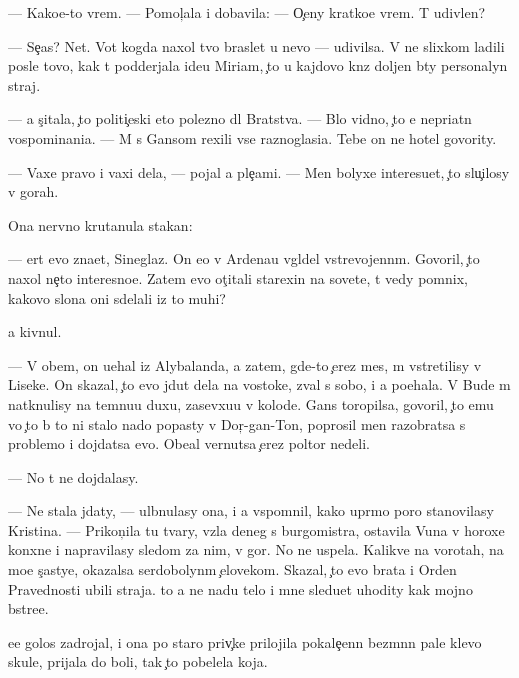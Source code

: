 \documentclass[10pt]{book}
\begin{document}
— Kako{\y}e-to vrem{\ia}. — Pomol{\c}ala i dobavila: — O{\c}eny kratko{\y}e vrem{\ia}. T{\yi} udivlen?

— Se{\y}{\c}as? Net. Vot kogda naxol tvo{\y} braslet u nevo — udivilsa. V{\yi} ne slixkom ladili posle tovo, kak t{\yi} podderjala ide{\y}u Miriam, {\c}to u kajdovo kn{\ia}z{\ia} doljen b{\yi}ty personalyn{\yi}{\y} straj.

— {\Y}a s{\c}itala, {\c}to politi{\c}eski eto polezno dl{\ia} Bratstva. — B{\yi}lo vidno, {\c}to {\y}e{\y} nepri{\y}atn{\yi} vospominani{\y}a. — M{\yi} s Gansom rexili vse raznoglasi{\y}a. Tebe on ne hotel govority.

— Vaxe pravo i vaxi dela, — pojal {\y}a ple{\c}ami. — Men{\ia} bolyxe interesu{\y}et, {\c}to slu{\c}ilosy v gorah.

Ona nervno krutanula stakan:

— {\C}ert {\y}evo zna{\y}et, Sineglaz{\yi}{\y}. On {\y}e{\x}o v Ardenau v{\yi}gl{\ia}del vstrevojenn{\yi}m. Govoril, {\c}to naxol ne{\c}to interesno{\y}e. Zatem {\y}evo ot{\c}itali stare{\y}xin{\yi} na sovete, t{\yi} vedy pomnix, kakovo slona oni sdelali iz to{\y} muhi?

{\Y}a kivnul.

— V ob{\x}em, on u{\y}ehal iz Alybalanda, a zatem, gde-to {\c}erez mes{\ia}{\q}, m{\yi} vstretilisy v Lise{\q}ke. On skazal, {\c}to {\y}evo jdut dela na vostoke, zval s sobo{\y}, i {\y}a po{\y}ehala. V Bude m{\yi} natknulisy na temnu{\y}u duxu, zasevxu{\y}u v kolod{\q}e. Gans toropilsa, govoril, {\c}to {\y}emu vo {\c}to b{\yi} to ni stalo nado popasty v Dor{\c}-gan-To{\y}n, poprosil men{\ia} razobratsa s problemo{\y} i dojdatsa {\y}evo. Obe{\x}al vernutsa {\c}erez poltor{\yi} nedeli.

— No t{\yi} ne dojdalasy.

— Ne stala jdaty, — ul{\yi}bnulasy ona, i {\y}a vspomnil, kako{\y} upr{\ia}mo{\y} poro{\y} stanovilasy Kristina. — Prikon{\c}ila tu tvary, vz{\ia}la deneg s burgomistra, ostavila V{\y}una v horoxe{\y} kon{\iu}xne i napravilasy sledom za nim, v gor{\yi}. No ne uspela. Kalikve{\q} na vorotah, na mo{\y}e s{\c}astye, okazalsa serdobolyn{\yi}m {\c}elovekom. Skazal, {\c}to {\y}evo brat{\y}a i Orden Pravednosti ubili straja. {\C}to {\y}a ne na{\y}du telo i mne sledu{\y}et uhodity kak mojno b{\yi}stre{\y}e.

{\Y}ee golos zadrojal, i ona po staro{\y} priv{\yi}{\c}ke prilojila pokale{\c}enn{\yi}{\y} bez{\yi}m{\ia}nn{\yi}{\y} pale{\q} klevo{\y} skule, prijala do boli, tak {\c}to pobelela koja.
\end{document}
